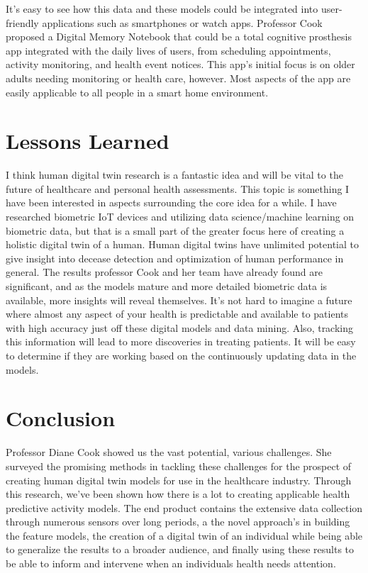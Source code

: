 \documentclass[journal,onecolumn]{IEEEtran}
\begin{document}
It's easy to see how this data and these models could be integrated into user-friendly applications such as smartphones or watch apps. Professor Cook proposed a Digital Memory Notebook that could be a total cognitive prosthesis app integrated with the daily lives of users, from scheduling appointments, activity monitoring, and health event notices. This app's initial focus is on older adults needing monitoring or health care, however. Most aspects of the app are easily applicable to all people in a smart home environment. 

\section{Lessons Learned}

I think human digital twin research is a fantastic idea and will be vital to the future of healthcare and personal health assessments. This topic is something I have been interested in aspects surrounding the core idea for a while. I have researched biometric IoT devices and utilizing data science/machine learning on biometric data, but that is a small part of the greater focus here of creating a holistic digital twin of a human. Human digital twins have unlimited potential to give insight into decease detection and optimization of human performance in general. The results professor Cook and her team have already found are significant, and as the models mature and more detailed biometric data is available, more insights will reveal themselves. It's not hard to imagine a future where almost any aspect of your health is predictable and available to patients with high accuracy just off these digital models and data mining. Also, tracking this information will lead to more discoveries in treating patients. It will be easy to determine if they are working based on the continuously updating data in the models. 

\section{Conclusion}

Professor Diane Cook showed us the vast potential, various challenges. She surveyed the promising methods in tackling these challenges for the prospect of creating human digital twin models for use in the healthcare industry. Through this research, we've been shown how there is a lot to creating applicable health predictive activity models. The end product contains the extensive data collection through numerous sensors over long periods, a the novel approach's in building the feature models, the creation of a digital twin of an individual while being able to generalize the results to a broader audience, and finally using these results to be able to inform and intervene when an individuals health needs attention.
\end{document}
